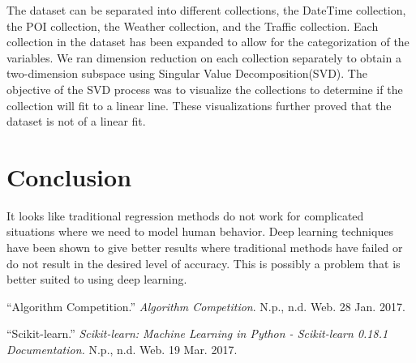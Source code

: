 \documentclass[paper=a4, fontsize=11pt]{scrartcl} %
\numberwithin{equation}{section} %
\numberwithin{table}{section} %
\begin{document}
The dataset can be separated into different collections, the DateTime collection, the POI collection, the Weather collection, and the Traffic collection. Each collection in the dataset has been expanded to allow for the categorization of the variables. We ran dimension reduction on each collection separately to obtain a two-dimension subspace using Singular Value Decomposition(SVD). The objective of the SVD process was to visualize the collections to determine if the collection will fit to a linear line.  These visualizations further proved that the dataset is not of a linear fit.

\section{Conclusion}
 
It looks like traditional regression methods do not work for complicated situations where we need to model human behavior. Deep learning techniques have been shown to give better results where traditional methods have failed or do not result in the desired level of accuracy. This is possibly a problem that is better suited to using deep learning.

\begin{thebibliography}{1}

\enquote{Algorithm Competition.} \textit{Algorithm Competition}. N.p., n.d. Web. 28 Jan. 2017.

\enquote{Scikit-learn.} \textit{Scikit-learn: Machine Learning in Python - Scikit-learn 0.18.1 Documentation.} N.p., n.d. Web. 19 Mar. 2017.

\end{thebibliography}
\end{document}
